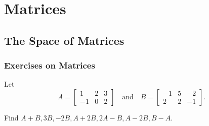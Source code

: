 \chapter{Matrices}

\section{The Space of Matrices}

\subsection{Exercises on Matrices}

\setcounter{exercise}{0}

\begin{exercise}
    Let
    \[
        A = \begin{bmatrix}
            1  & 2 & 3 \\
            -1 & 0 & 2
        \end{bmatrix}
        \quad\text{and}\quad
        B = \begin{bmatrix}
            -1 & 5 & -2 \\
            2  & 2 & -1
        \end{bmatrix}.
    \]

    Find $A + B, 3B, -2B, A + 2B, 2A - B, A - 2B, B - A$.
\end{exercise}

